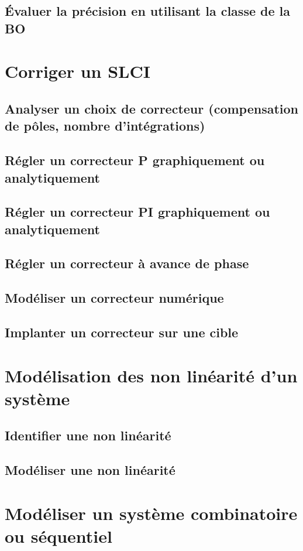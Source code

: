 \section{Évaluer la précision en utilisant la classe de la BO} 
\setchapterpreamble[u]{\margintoc} 
\chapter{Corriger un SLCI} 
\section{Analyser un choix de correcteur (compensation de pôles, nombre d'intégrations)} 
\section{Régler un correcteur P graphiquement ou analytiquement} 
\section{Régler un correcteur PI graphiquement ou analytiquement} 
\section{Régler un correcteur à avance de phase} 
\section{Modéliser un correcteur numérique} 
\section{Implanter un correcteur sur une cible} 
\setchapterpreamble[u]{\margintoc} 
\chapter{Modélisation des non linéarité d'un système} 
\section{Identifier une non linéarité} 
\section{Modéliser une non linéarité} 
\setchapterpreamble[u]{\margintoc} 
\chapter{Modéliser un système combinatoire ou séquentiel} 
